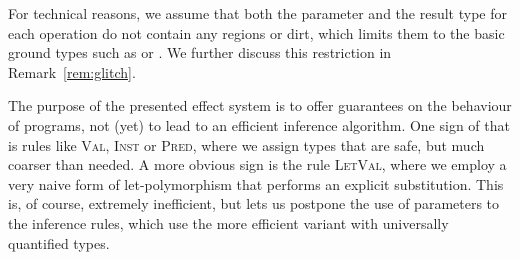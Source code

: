 \documentclass{LMCS}
\newcommand{\rulename}[1]{{\mdseries \small \textsc{#1}}}
\begin{document}
For technical reasons, we assume that both the parameter and the result type for each operation do not contain any regions or dirt,
which limits them to the basic ground types such as  or .
We further discuss this restriction in Remark~\ref{rem:glitch}.


The purpose of the presented effect system is to offer guarantees on the behaviour of programs,
not (yet) to lead to an efficient inference algorithm.
One sign of that is rules like \rulename{Val}, \rulename{Inst} or \rulename{Pred},
where we assign types that are safe, but much coarser than needed.
A more obvious sign is the rule \rulename{LetVal},
where we employ a very naive form of let-polymorphism that performs an explicit substitution.
This is, of course, extremely inefficient, but lets us postpone the use of parameters to
the inference rules, which use the more efficient variant with universally quantified types.
\end{document}
